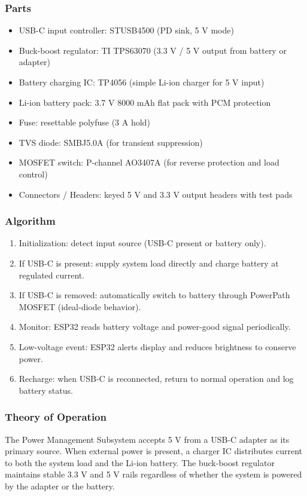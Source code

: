 \subsubsection{Parts}
\begin{itemize}
    \item USB-C input controller: STUSB4500 (PD sink, 5 V mode)
    \item Buck-boost regulator: TI TPS63070 (3.3 V / 5 V output from battery or adapter)
    \item Battery charging IC: TP4056 (simple Li-ion charger for 5 V input)
    \item Li-ion battery pack: 3.7 V 8000 mAh flat pack with PCM protection
    \item Fuse: resettable polyfuse (3 A hold)
    \item TVS diode: SMBJ5.0A (for transient suppression)
    \item MOSFET switch: P-channel AO3407A (for reverse protection and load control)
    \item Connectors / Headers: keyed 5 V and 3.3 V output headers with test pads
\end{itemize}

\subsubsection{Algorithm}
\begin{enumerate}
    \item Initialization: detect input source (USB-C present or battery only).
    \item If USB-C is present: supply system load directly and charge battery at regulated current.
    \item If USB-C is removed: automatically switch to battery through PowerPath MOSFET (ideal-diode behavior).
    \item Monitor: ESP32 reads battery voltage and power-good signal periodically.
    \item Low-voltage event: ESP32 alerts display and reduces brightness to conserve power.
    \item Recharge: when USB-C is reconnected, return to normal operation and log battery status.
\end{enumerate}

\subsubsection{Theory of Operation}
The Power Management Subsystem accepts 5 V from a USB-C adapter as its primary source.
When external power is present, a charger IC distributes current to both the system load and the Li-ion battery. The buck-boost regulator maintains stable 3.3 V and 5 V rails regardless of whether the system is powered by the adapter or the battery.

